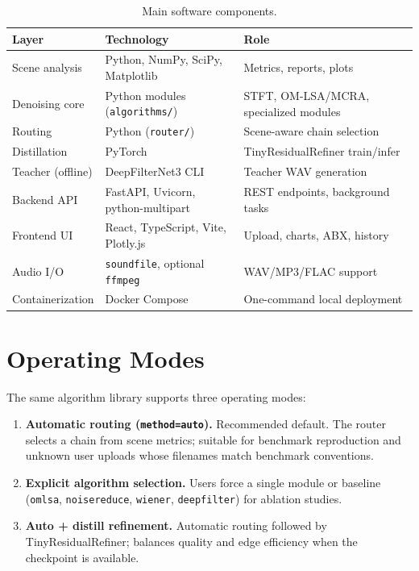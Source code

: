 \begin{table}[H]
  \centering
  \caption{Main software components.}
  \label{tab:software_stack}
  \begin{tabular}{lll}
    \toprule
    \textbf{Layer} & \textbf{Technology} & \textbf{Role} \\
    \midrule
    Scene analysis   & Python, NumPy, SciPy, Matplotlib & Metrics, reports, plots \\
    Denoising core   & Python modules (\texttt{algorithms/}) & STFT, OM-LSA/MCRA, specialized modules \\
    Routing          & Python (\texttt{router/})           & Scene-aware chain selection \\
    Distillation     & PyTorch                             & TinyResidualRefiner train/infer \\
    Teacher (offline)& DeepFilterNet3 CLI                  & Teacher WAV generation \\
    Backend API      & FastAPI, Uvicorn, python-multipart & REST endpoints, background tasks \\
    Frontend UI      & React, TypeScript, Vite, Plotly.js  & Upload, charts, ABX, history \\
    Audio I/O        & \texttt{soundfile}, optional \texttt{ffmpeg} & WAV/MP3/FLAC support \\
    Containerization & Docker Compose                      & One-command local deployment \\
    \bottomrule
  \end{tabular}
\end{table}

\section{Operating Modes}
\label{sec:operating_modes}

The same algorithm library supports three operating modes:

\begin{enumerate}
  \item \textbf{Automatic routing (\texttt{method=auto}).} Recommended default. The router selects a chain from scene metrics; suitable for benchmark reproduction and unknown user uploads whose filenames match benchmark conventions.
  \item \textbf{Explicit algorithm selection.} Users force a single module or baseline (\texttt{omlsa}, \texttt{noisereduce}, \texttt{wiener}, \texttt{deepfilter}) for ablation studies.
  \item \textbf{Auto + distill refinement.} Automatic routing followed by TinyResidualRefiner; balances quality and edge efficiency when the checkpoint is available.
\end{enumerate}


